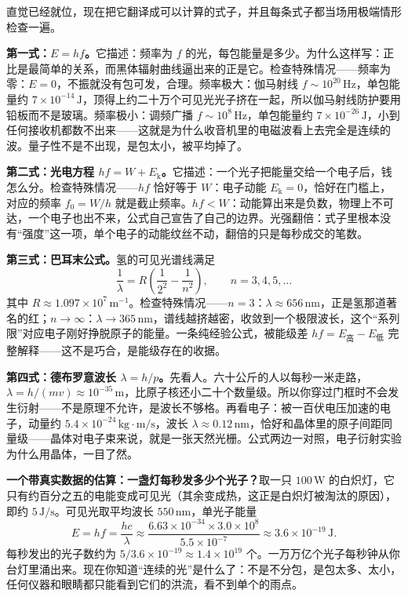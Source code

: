 直觉已经就位，现在把它翻译成可以计算的式子，并且每条式子都当场用极端情形检查一遍。

\textbf{第一式：\(E = hf\)。}它描述：频率为 \(f\) 的光，每包能量是多少。为什么这样写：正比是最简单的关系，而黑体辐射曲线逼出来的正是它。检查特殊情况——频率为零：\(E = 0\)，不振就没有包可发，合理。频率极大：伽马射线 \(f \sim 10^{20}\,\mathrm{Hz}\)，单包能量约 \(7\times10^{-14}\,\mathrm{J}\)，顶得上约二十万个可见光光子挤在一起，所以伽马射线防护要用铅板而不是玻璃。频率极小：调频广播 \(f \sim 10^{8}\,\mathrm{Hz}\)，单包能量约 \(7\times10^{-26}\,\mathrm{J}\)，小到任何接收机都数不出来——这就是为什么收音机里的电磁波看上去完全是连续的波。量子性不是不出现，是包太小，被平均掉了。

\textbf{第二式：光电方程 \(hf = W + E_{\mathrm{k}}\)。}它描述：一个光子把能量交给一个电子后，钱怎么分。检查特殊情况——\(hf\) 恰好等于 \(W\)：电子动能 \(E_{\mathrm{k}} = 0\)，恰好在门槛上，对应的频率 \(f_0 = W/h\) 就是截止频率。\(hf < W\)：动能算出来是负数，物理上不可达，一个电子也出不来，公式自己宣告了自己的边界。光强翻倍：式子里根本没有“强度”这一项，单个电子的动能纹丝不动，翻倍的只是每秒成交的笔数。

\textbf{第三式：巴耳末公式。}氢的可见光谱线满足
\[
\frac{1}{\lambda} = R\left(\frac{1}{2^2} - \frac{1}{n^2}\right), \qquad n = 3, 4, 5, \dots
\]
其中 \(R \approx 1.097\times10^{7}\,\mathrm{m^{-1}}\)。检查特殊情况——\(n = 3\)：\(\lambda \approx 656\,\mathrm{nm}\)，正是氢那道著名的红；\(n \to \infty\)：\(\lambda \to 365\,\mathrm{nm}\)，谱线越挤越密，收敛到一个极限波长，这个“系列限”对应电子刚好挣脱原子的能量。一条纯经验公式，被能级差 \(hf = E_{\text{高}} - E_{\text{低}}\) 完整解释——这不是巧合，是能级存在的收据。

\textbf{第四式：德布罗意波长 \(\lambda = h/p\)。}先看人。六十公斤的人以每秒一米走路，\(\lambda = h/(mv) \approx 10^{-35}\,\mathrm{m}\)，比原子核还小二十个数量级。所以你穿过门框时不会发生衍射——不是原理不允许，是波长不够格。再看电子：被一百伏电压加速的电子，动量约 \(5.4\times10^{-24}\,\mathrm{kg\cdot m/s}\)，波长 \(\lambda \approx 0.12\,\mathrm{nm}\)，恰好和晶体里的原子间距同量级——晶体对电子束来说，就是一张天然光栅。公式两边一对照，电子衍射实验为什么用晶体，一目了然。

\textbf{一个带真实数据的估算：一盏灯每秒发多少个光子？}取一只 \(100\,\mathrm{W}\) 的白炽灯，它只有约百分之五的电能变成可见光（其余变成热，这正是白炽灯被淘汰的原因），即约 \(5\,\mathrm{J/s}\)。可见光取平均波长 \(550\,\mathrm{nm}\)，单光子能量
\[
E = hf = \frac{hc}{\lambda} \approx \frac{6.63\times10^{-34}\times3.0\times10^{8}}{5.5\times10^{-7}} \approx 3.6\times10^{-19}\,\mathrm{J}.
\]
每秒发出的光子数约为 \(5 / 3.6\times10^{-19} \approx 1.4\times10^{19}\) 个。一万万亿个光子每秒钟从你台灯里涌出来。现在你知道“连续的光”是什么了：不是不分包，是包太多、太小，任何仪器和眼睛都只能看到它们的洪流，看不到单个的雨点。

